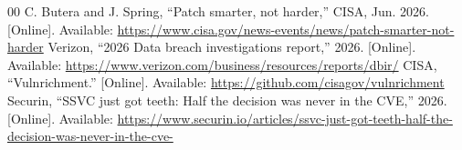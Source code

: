 \documentclass[conference]{IEEEtran}
\begin{document}
\begin{thebibliography}{00}
 C. Butera and J. Spring, ``Patch smarter, not harder,'' CISA, Jun. 2026. [Online]. Available: \url{https://www.cisa.gov/news-events/news/patch-smarter-not-harder}
 Verizon, ``2026 Data breach investigations report,'' 2026. [Online]. Available: \url{https://www.verizon.com/business/resources/reports/dbir/}
 CISA, ``Vulnrichment.'' [Online]. Available: \url{https://github.com/cisagov/vulnrichment}
 Securin, ``SSVC just got teeth: Half the decision was never in the CVE,'' 2026. [Online]. Available: \url{https://www.securin.io/articles/ssvc-just-got-teeth-half-the-decision-was-never-in-the-cve-}
\end{thebibliography}
\end{document}
